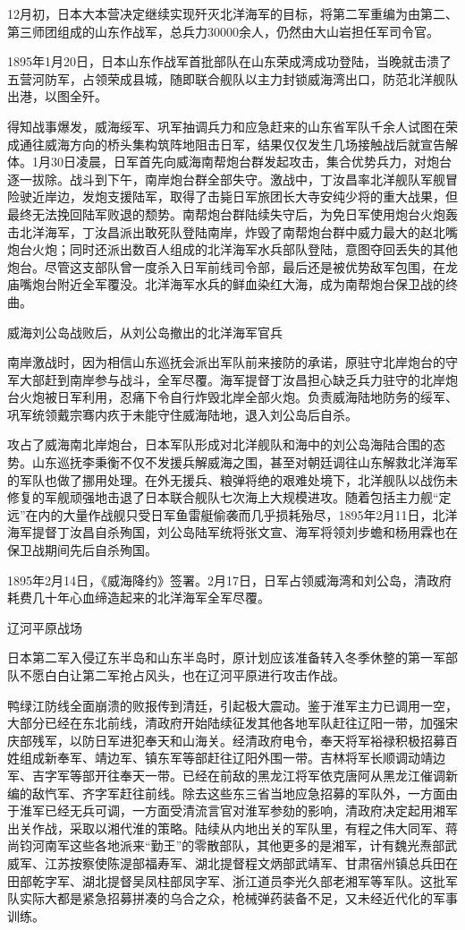 \documentclass[12pt,UTF8]{ctexbook}
\begin{document}
12月初，日本大本营决定继续实现歼灭北洋海军的目标，将第二军重编为由第二、第三师团组成的山东作战军，总兵力30000余人，仍然由大山岩担任军司令官。

1895年1月20日，日本山东作战军首批部队在山东荣成湾成功登陆，当晚就击溃了五营河防军，占领荣成县城，随即联合舰队以主力封锁威海湾出口，防范北洋舰队出港，以图全歼。

得知战事爆发，威海绥军、巩军抽调兵力和应急赶来的山东省军队千余人试图在荣成通往威海方向的桥头集构筑阵地阻击日军，结果仅仅发生几场接触战后就宣告解体。1月30日凌晨，日军首先向威海南帮炮台群发起攻击，集合优势兵力，对炮台逐一拔除。战斗到下午，南岸炮台群全部失守。激战中，丁汝昌率北洋舰队军舰冒险驶近岸边，发炮支援陆军，取得了击毙日军旅团长大寺安纯少将的重大战果，但最终无法挽回陆军败退的颓势。南帮炮台群陆续失守后，为免日军使用炮台火炮轰击北洋海军，丁汝昌派出敢死队登陆南岸，炸毁了南帮炮台群中威力最大的赵北嘴炮台火炮；同时还派出数百人组成的北洋海军水兵部队登陆，意图夺回丢失的其他炮台。尽管这支部队曾一度杀入日军前线司令部，最后还是被优势敌军包围，在龙庙嘴炮台附近全军覆没。北洋海军水兵的鲜血染红大海，成为南帮炮台保卫战的终曲。


威海刘公岛战败后，从刘公岛撤出的北洋海军官兵

南岸激战时，因为相信山东巡抚会派出军队前来接防的承诺，原驻守北岸炮台的守军大部赶到南岸参与战斗，全军尽覆。海军提督丁汝昌担心缺乏兵力驻守的北岸炮台火炮被日军利用，忍痛下令自行炸毁北岸全部火炮。负责威海陆地防务的绥军、巩军统领戴宗骞内疚于未能守住威海陆地，退入刘公岛后自杀。

攻占了威海南北岸炮台，日本军队形成对北洋舰队和海中的刘公岛海陆合围的态势。山东巡抚李秉衡不仅不发援兵解威海之围，甚至对朝廷调往山东解救北洋海军的军队也做了挪用处理。在外无援兵、粮弹将绝的艰难处境下，北洋舰队以战伤未修复的军舰顽强地击退了日本联合舰队七次海上大规模进攻。随着包括主力舰“定远”在内的大量作战舰只受日军鱼雷艇偷袭而几乎损耗殆尽，1895年2月11日，北洋海军提督丁汝昌自杀殉国，刘公岛陆军统将张文宣、海军将领刘步蟾和杨用霖也在保卫战期间先后自杀殉国。

1895年2月14日，《威海降约》签署。2月17日，日军占领威海湾和刘公岛，清政府耗费几十年心血缔造起来的北洋海军全军尽覆。

辽河平原战场

日本第二军入侵辽东半岛和山东半岛时，原计划应该准备转入冬季休整的第一军部队不愿白白让第二军抢占风头，也在辽河平原进行攻击作战。

鸭绿江防线全面崩溃的败报传到清廷，引起极大震动。鉴于淮军主力已调用一空，大部分已经在东北前线，清政府开始陆续征发其他各地军队赶往辽阳一带，加强宋庆部残军，以防日军进犯奉天和山海关。经清政府电令，奉天将军裕禄积极招募百姓组成新奉军、靖边军、镇东军等部赶往辽阳外围一带。吉林将军长顺调动靖边军、吉字军等部开往奉天一带。已经在前敌的黑龙江将军依克唐阿从黑龙江催调新编的敌忾军、齐字军赶往前线。除去这些东三省当地应急招募的军队外，一方面由于淮军已经无兵可调，一方面受清流言官对淮军参劾的影响，清政府决定起用湘军出关作战，采取以湘代淮的策略。陆续从内地出关的军队里，有程之伟大同军、蒋尚钧河南军这些各地派来“勤王”的零散部队，其他更多的是湘军，计有魏光焘部武威军、江苏按察使陈湜部福寿军、湖北提督程文炳部武靖军、甘肃宿州镇总兵田在田部乾字军、湖北提督吴凤柱部凤字军、浙江道员李光久部老湘军等军队。这批军队实际大都是紧急招募拼凑的乌合之众，枪械弹药装备不足，又未经近代化的军事训练。
\end{document}
